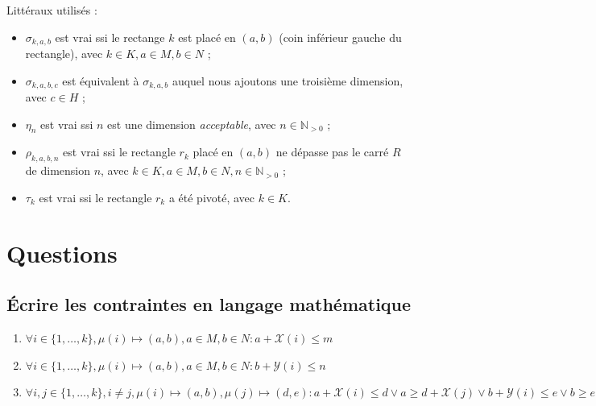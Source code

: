 \documentclass[a4paper]{article}
\begin{document}
Littéraux utilisés :
\begin{itemize}
	\item $\sigma_{k,a,b}$ est vrai ssi le rectange $k$ est placé en $(a,b)$ (coin inférieur gauche du rectangle), avec $k \in K, a \in M, b \in N$ ;
	\item $\sigma_{k,a,b,c}$ est équivalent à $\sigma_{k,a,b}$ auquel nous ajoutons une troisième dimension, avec $c \in H$ ;
	\item $\eta_n$ est vrai ssi $n$ est une dimension \textit{acceptable}, avec $n \in \mathbb{N}_{>0}$ ;
	\item $\rho_{k,a,b,n}$ est vrai ssi le rectangle $r_k$ placé en $(a,b)$ ne dépasse pas le carré $R$ de dimension $n$, avec $k \in K, a \in M, b \in N, n \in \mathbb{N}_{>0}$ ;
	\item $\tau_k$ est vrai ssi le rectangle $r_k$ a été pivoté, avec $k \in K$.
	
\end{itemize}
\section{Questions}
\subsection{Écrire les contraintes en langage mathématique}
\begin{enumerate}
	\item $\forall i \in \{1,\dots, k\}, \mu(i) \mapsto (a,b), a\in M, b\in N : a+\mathcal{X}(i) \leq m $
	\item $\forall i \in \{1,\dots, k\}, \mu(i) \mapsto (a,b), a\in M, b\in N : b+\mathcal{Y}(i) \leq n $
	\item $\forall i, j \in \{1,\dots, k\},  i \neq j, \mu(i) \mapsto (a, b),  \mu(j) \mapsto (d,e) :  a + \mathcal{X}(i) \leq d \lor a \geq d +\mathcal{X}(j) \lor b + \mathcal{Y}(i) \leq e \lor b \geq e + \mathcal{Y}(j) $
\end{enumerate}

\newpage
\end{document}
